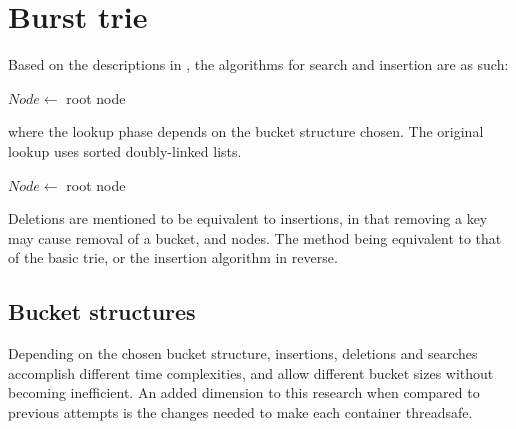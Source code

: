 \section{Burst trie}
Based on the descriptions in \cite{Nash2008}, the algorithms for search
and insertion are as such:

\begin{algorithm}[H]
    \caption{$k$\FuncSty{)}}
    \label{alg:bt_search}

    $Node \leftarrow$  root node\;
\end{algorithm}

where the lookup phase depends on the bucket structure chosen. The original
lookup uses sorted doubly-linked lists. 

\begin{algorithm}[H]
    \caption{$k$\FuncSty{)}}
    \label{alg:bt_insert}


    $Node \leftarrow$  root node\;
\end{algorithm}

Deletions are mentioned to be equivalent to insertions, in that removing a key
may cause removal of a bucket, and nodes. The method being equivalent to that
of the basic trie, or the insertion algorithm in reverse.

\begin{algorithm}[H]
    \caption{$b$\FuncSty{)}}
    \label{alg:bt_burst}

\end{algorithm}


\subsection{Bucket structures}
Depending on the chosen bucket structure, insertions, deletions and searches
accomplish different time complexities, and allow different bucket sizes
without becoming inefficient.
An added dimension to this research when compared to previous attempts is the
changes needed to make each container threadsafe.

